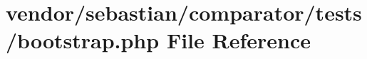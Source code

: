 \section{vendor/sebastian/comparator/tests/bootstrap.php File Reference}
\label{sebastian_2comparator_2tests_2bootstrap_8php}

